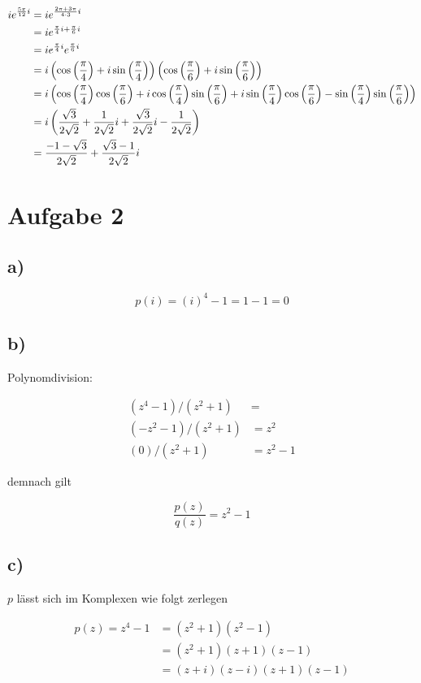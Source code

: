 \documentclass[a4paper, 11pt]{article}
\begin{document}
\begin{align*}
    i e^{\frac{5\pi}{12}i} &= i e^{\frac{2\pi + 3\pi}{4 \cdot 3}i} \\
    &= i e^{\frac{\pi}{4}i + \frac{\pi}{6}i} \\
    &= i e^{\frac{\pi}{4}i} e^{\frac{\pi}{6}i} \\
    &= i \left(\cos \left(\frac{\pi}{4}\right) + i\sin \left(\frac{\pi}{4}\right)\right)
        \left(\cos \left(\frac{\pi}{6}\right) + i\sin \left(\frac{\pi}{6}\right)\right) \\
    &= i \left(\cos \left(\frac{\pi}{4}\right)\cos \left(\frac{\pi}{6}\right) + i \cos \left(\frac{\pi}{4}\right)\sin \left(\frac{\pi}{6}\right)
        +i \sin \left(\frac{\pi}{4}\right)\cos \left(\frac{\pi}{6}\right) - \sin \left(\frac{\pi}{4}\right)\sin \left(\frac{\pi}{6}\right)\right) \\
    &= i \left(\frac{\sqrt{3}}{2\sqrt{2}} + \frac{1}{2\sqrt{2}}i +
        \frac{\sqrt{3}}{2\sqrt{2}}i - \frac{1}{2\sqrt{2}}\right) \\
    &= \frac{-1 - \sqrt{3}}{2\sqrt{2}} + \frac{\sqrt{3} - 1}{2\sqrt{2}}i
\end{align*}

\section{Aufgabe 2}
\label{sec:orgc4ab504}
\subsection{a)}
\label{sec:orgd3df44d}
$$ p(i) = (i)^4 - 1 = 1 - 1 = 0 $$

\subsection{b)}
\label{sec:orgfac6d1e}
Polynomdivision:

\begin{align*}
    (z^4 - 1) / (z^2 + 1) &= \\
    (-z^2 - 1) / (z^2 + 1) &= z^2 \\
    (0) / (z^2 + 1) &= z^2 - 1
\end{align*}

demnach gilt

$$ \frac{p(z)}{q(z)} = z^2 - 1 $$

\subsection{c)}
\label{sec:org48a6b17}
\(p\) lässt sich im Komplexen wie folgt zerlegen

\begin{align*}
    p(z) = z^4 - 1 &= (z^2 + 1)(z^2 - 1) \\
    &= (z^2 + 1)(z + 1)(z - 1) \\
    &= (z + i)(z - i)(z + 1)(z - 1) \\
\end{align*}
\end{document}
